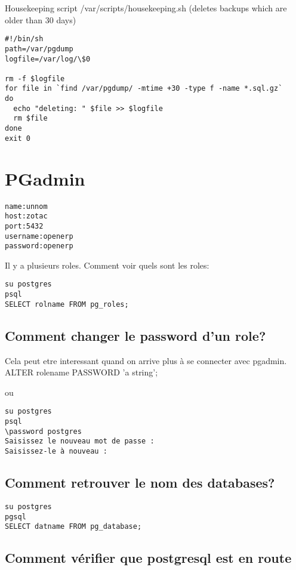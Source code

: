 \documentclass[12pt,a4paper]{article}
\begin{document}
Housekeeping script /var/scripts/housekeeping.sh (deletes backups which are older than 30 days)

\begin{verbatim}
#!/bin/sh
path=/var/pgdump
logfile=/var/log/\$0

rm -f $logfile
for file in `find /var/pgdump/ -mtime +30 -type f -name *.sql.gz`
do
  echo "deleting: " $file >> $logfile
  rm $file
done
exit 0
\end{verbatim}


\section{PGadmin}
\label{sec:pgadmin_remote}


\begin{alltt}
name:unnom
host:zotac
port: 5432
username: openerp
password: openerp
\end{alltt}

Il y a plusieurs roles.
Comment voir quels sont les roles:
\begin{verbatim}
su postgres
psql
SELECT rolname FROM pg_roles;
\end{verbatim}


\subsection{Comment changer le password d'un role?}
\label{sec:chpass}

Cela peut etre interessant quand on arrive plus à se connecter avec pgadmin.
ALTER rolename PASSWORD 'a string';

ou 
\begin{verbatim}
su postgres
psql
\password postgres
Saisissez le nouveau mot de passe :
Saisissez-le à nouveau :
\end{verbatim}

\subsection{Comment retrouver le nom des databases?}
\label{sec:databas_name}

\begin{verbatim}
su postgres
pgsql 
SELECT datname FROM pg_database;
\end{verbatim}

\subsection{Comment vérifier que postgresql est en route}
\label{sec:postgresql}
\end{document}
